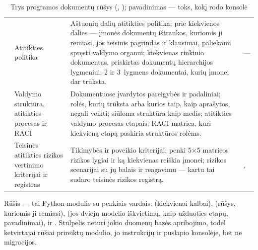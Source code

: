 \begin{table}[H]
\caption{Trys programos dokumentų rūšys (, ); pavadinimas --- toks, kokį rodo konsolė}\label{tab:programme:kinds}
\begin{tabularx}{\textwidth}{@{}L{19mm}L{37mm}YL{17mm}@{}}
\toprule
{} &  &  &  \\
\midrule
{} & Atitikties politika &
  Aštuonių dalių atitikties politika; prie kiekvienos dalies --- įmonės dokumentų ištraukos,
  kuriomis ji remiasi, jos teisinis pagrindas ir klausimai, paliekami spręsti valdymo organui;
  kiekvienas rinkinio dokumentas, priskirtas dokumentų hierarchijos lygmeniui; 2 ir 3~lygmens
  dokumentai, kurių įmonei dar trūksta. & --- \\
 & Valdymo struktūra, atitikties procesas ir RACI &
  Dokumentuose įvardytos pareigybės ir padaliniai; rolės, kurių trūksta arba kurios taip, kaip
  aprašytos, negali veikti; siūloma struktūra kaip medis; atitikties valdymo procesas etapais;
  RACI matrica, kuri kiekvieną etapą paskiria struktūros rolėms. &  \\
 & Teisinės atitikties rizikos vertinimo kriterijai ir registras &
  Tikimybės ir poveikio kriterijai; penki 5×5 matricos rizikos lygiai ir ką kiekvienas reiškia
  įmonei; rizikos scenarijai su jų balais ir reagavimu --- kartu tai sudaro teisinės rizikos
  registrą. & ,  \\
\bottomrule
\end{tabularx}
\end{table}

Rūšis --- tai Python modulis su penkiais vardais:  (kiekvienai kalbai),
 (rūšys, kuriomis ji remiasi),  (jos dviejų modelio iškvietimų,
kaip užduoties etapų, pavadinimai),  ir
. Stulpelis  neturi jokio
duomenų bazės apribojimo, todėl ketvirtajai rūšiai prireiktų modulio, jo instrukcijų ir
puslapio konsolėje, bet ne migracijos.

